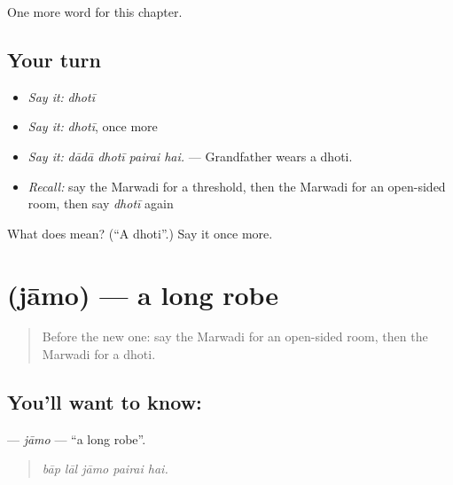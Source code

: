 \begin{grammarlens}[title={What you've built}]
One more word for this chapter.
\end{grammarlens}

\subsection*{Your turn}
\begin{itemize}
\raggedright
  \item \emph{Say it:} \emph{dhotī}
  \item \emph{Say it:} \emph{dhotī}, once more
  \item \emph{Say it:} \emph{dādā dhotī pairai hai.} — Grandfather wears a dhoti.
  \item \emph{Recall:} say the Marwadi for a threshold, then the Marwadi for an open-sided room, then say \emph{dhotī} again
\end{itemize}

\begin{tcolorbox}[breakable,colback=teal!4,colframe=teal!35!black,title={Before you move on}]
What does  mean? (\textquotedblleft{}A dhoti\textquotedblright{}.) Say it once more.
\end{tcolorbox}
\section[\texorpdfstring{\mw{जामो} (jāmo)}{जामो (jāmo)}]{ (jāmo) — a long robe}

\label{lesson:MW-C190-jamo}



\begin{quote}
Before the new one: say the Marwadi for an open-sided room, then the Marwadi for a dhoti.
\end{quote}

\subsection*{You'll want to know: }
\textbf{} — \emph{jāmo} — \textquotedblleft{}a long robe\textquotedblright{}.

\begin{quote}
    
\end{quote}

\begin{quote}
\emph{bāp lāl jāmo pairai hai.}
\end{quote}

